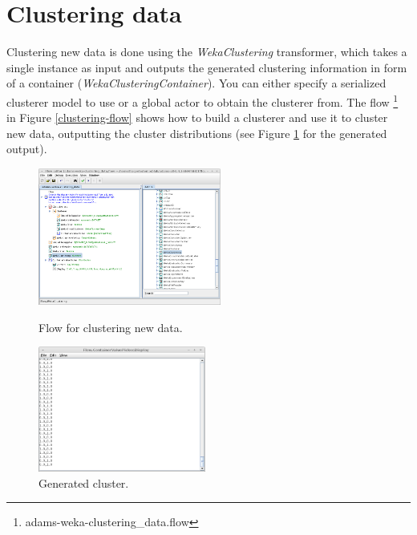 \section{Clustering data}
Clustering new data is done using the \textit{WekaClustering} transformer, which
takes a single instance as input and outputs the generated clustering
information in form of a container (\textit{WekaClusteringContainer}). You can
either specify a serialized clusterer model to use or a global actor to obtain
the clusterer from. The flow \footnote{adams-weka-clustering\_data.flow} in
Figure \ref{clustering-flow} shows how to build a clusterer and use it to
cluster new data, outputting the cluster distributions (see Figure
\ref{clustering-output} for the generated output).

\begin{figure}[ht]
  \begin{minipage}[t]{0.5\linewidth}
    \centering
    \includegraphics[width=6.0cm]{images/clustering-flow.png}
    \caption{Flow for clustering new data.}
    \label{clustering-flow}
  \end{minipage}
  \hspace{0.5cm}
  \begin{minipage}[t]{0.5\linewidth}
    \centering
    \includegraphics[width=5.5cm]{images/clustering-output.png}
    \caption{Generated cluster.}
    \label{clustering-output}
  \end{minipage}
\end{figure}
